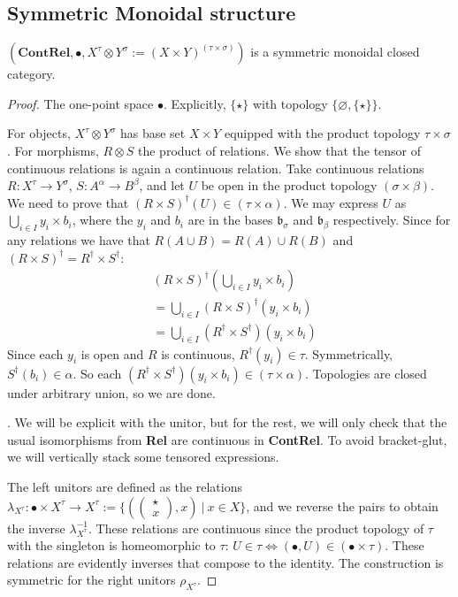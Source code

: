 \begin{marginfigure}
\subsection{Symmetric Monoidal structure}

\begin{proposition}
$(\mathbf{ContRel},\bullet,X^\tau \otimes Y^\sigma := (X \times Y)^{(\tau \times \sigma)})$ is a symmetric monoidal closed category.
\begin{proof}

 The one-point space $\bullet$. Explicitly, $\{\star\}$ with topology $\{\varnothing,\{\star\}\}$.

 For objects, $X^\tau \otimes Y^\sigma$ has base set $X \times Y$ equipped with the product topology $\tau \times \sigma$. For morphisms, $R \otimes S$ the product of relations. We show that the tensor of continuous relations is again a continuous relation. Take continuous relations $R: X^\tau \rightarrow Y^\sigma$, $S: A^\alpha \rightarrow B^\beta$, and let $U$ be open in the product topology $(\sigma \times \beta)$. We need to prove that $(R \times S)^\dag(U) \in (\tau \times \alpha)$. We may express $U$ as $\bigcup\limits_{i \in I} y_i \times b_i$, where the $y_i$ and $b_i$ are in the bases $\mathfrak{b}_\sigma$ and $\mathfrak{b}_\beta$ respectively. Since for any relations we have that $R(A \cup B) = R(A) \cup R(B)$ and $(R \times S)^\dag = R^\dag \times S^\dag$:
\begin{align*}
&(R \times S)^\dag(\bigcup\limits_{i \in I} y_i \times b_i)\\
 &= \bigcup\limits_{i \in I}(R \times S)^\dag(y_i \times b_i)\\
 &= \bigcup\limits_{i \in I}(R^\dag \times S^\dag)(y_i \times b_i)
 \end{align*}
Since each $y_i$ is open and $R$ is continuous, $R^\dag(y_i) \in \tau$. Symmetrically, $S^\dag(b_i) \in \alpha$. So each $(R^\dag \times S^\dag)(y_i \times b_i) \in (\tau \times \alpha)$. Topologies are closed under arbitrary union, so we are done.

. We will be explicit with the unitor, but for the rest, we will only check that the usual isomorphisms from \textbf{Rel} are continuous in \textbf{ContRel}. To avoid bracket-glut, we will vertically stack some tensored expressions.

 The left unitors are defined as the relations $\lambda_{X^{\tau}}: \bullet \times X^\tau \rightarrow X^\tau := \{(\begin{pmatrix}\star \\x \end{pmatrix}, x) \ | \ x \in X\}$, and we reverse the pairs to obtain the inverse $\lambda^{-1}_{X^{\tau}}$. These relations are continuous since the product topology of $\tau$ with the singleton is homeomorphic to $\tau$: $U \in \tau \iff (\bullet,U) \in (\bullet \times \tau)$. These relations are evidently inverses that compose to the identity. The construction is symmetric for the right unitors $\rho_{X^{\tau}}$.


\end{proof}
\end{proposition}
\end{marginfigure}
